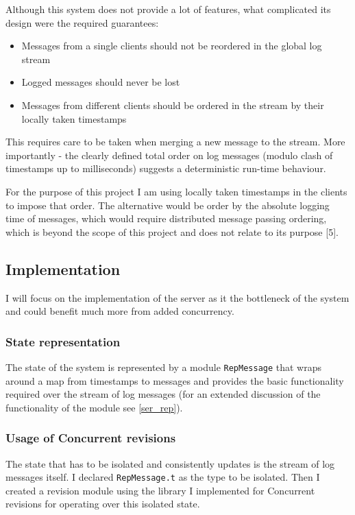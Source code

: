 \documentclass[12pt,twoside,notitlepage]{report}
\begin{document}
{{Although this system does not provide a lot of features, what complicated its design were the required guarantees:
\begin{itemize}
\item
Messages from a single clients should not be reordered in the global log stream
\item
Logged messages should never be lost
\item
Messages from different clients should be ordered in the stream by their locally taken timestamps
\end{itemize}

This requires care to be taken when merging a new message to the stream. More importantly - the clearly defined total order on log messages (modulo clash of timestamps up to milliseconds) suggests a deterministic run-time behaviour.

For the purpose of this project I am using locally taken timestamps in the clients to impose that order. The alternative would be order by the absolute logging time of messages, which would require distributed message passing ordering, which is beyond the scope of this project and does not relate to its purpose [5]. 

\subsection{Implementation}
\label{log_imp}
I will focus on the implementation of the server as it the bottleneck of the system and could benefit much more from added concurrency.

\subsubsection{State representation}
The state of the system is represented by a module {\tt RepMessage} that wraps around a map from timestamps to messages and provides the basic functionality required over the stream of log messages (for an extended discussion of the functionality of the module see \ref{ser_rep}). 

\subsubsection{Usage of Concurrent revisions}
\label{log_usage}
The state that has to be isolated and consistently updates is the stream of log messages itself. I declared {\tt RepMessage.t} as the type to be isolated. Then I created a revision module using the library I implemented for Concurrent revisions for operating over this isolated state. 

}}
\end{document}
